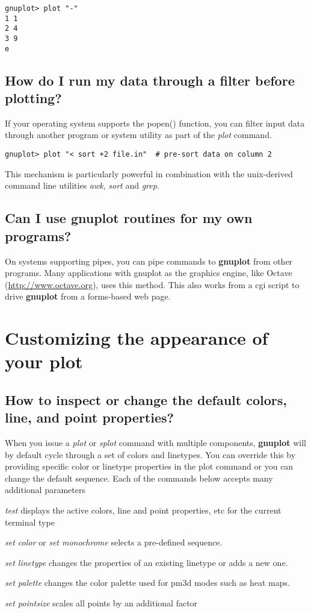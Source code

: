 \documentclass[a4paper,11pt]{article}
\def\http#1{{\small\href{http://#1}{\url{http://#1}}}}
\newcommand{\http}[1]%
            {\htmladdnormallink{\latex{\url{http://#1}}%
                    \html{\textit{http://#1}}}%
                {http://#1}%
            }
\newcommand{\gnuplot}{\textbf{gnuplot }}
\begin{document}
\small
\begin{verbatim}
gnuplot> plot "-"
1 1
2 4
3 9
e
\end{verbatim}
\normalsize

\subsection{How do I run my data through a filter before plotting?}

If your operating system supports the popen() function, you
can filter input data through another program or system utility
as part of the {\em plot} command.

\small
\begin{verbatim}
gnuplot> plot "< sort +2 file.in"  # pre-sort data on column 2
\end{verbatim}
\normalsize

This mechanism is particularly powerful in combination with the
unix-derived command line utilities {\em awk}, {\em sort} and {\em grep}.

\subsection{Can I use \gnuplot routines for my own programs?}

On systems supporting pipes, you can pipe commands to \gnuplot from other
programs. Many applications with gnuplot as the graphics engine, like Octave
(\http{www.octave.org}), uses this method. This also works from a cgi script to
drive \gnuplot from a forms-based web page.


\section{Customizing the appearance of your plot}

\subsection{How to inspect or change the default colors, line, and point properties?}

When you issue a {\em plot} or {\em splot} command with multiple components,
\gnuplot will by default cycle through a set of colors and linetypes.
You can override this by providing specific color or linetype properties in the
plot command or you can change the default sequence.
Each of the commands below accepts many additional parameters
\begin{list}{}{}
  \item
  {\em test} displays the active colors, line and point properties, etc
             for the current terminal type
  \item
  {\em set color} or {\em set monochrome} selects a pre-defined sequence.
  \item
  {\em set linetype} changes the properties of an existing linetype or adds a new one.
  \item
  {\em set palette} changes the color palette used for pm3d modes such as heat maps.
  \item
  {\em set pointsize} scales all points by an additional factor
\end{list}
\end{document}
